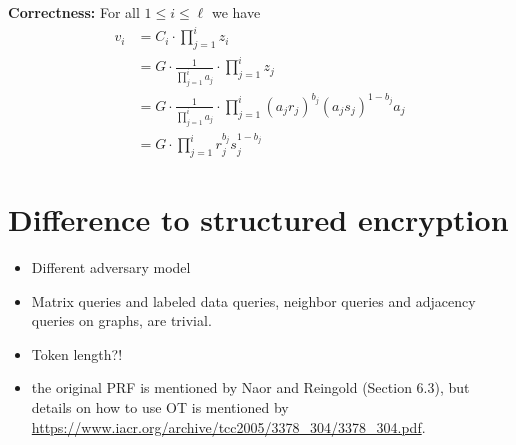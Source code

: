 {\bf Correctness:}  For all $1 \leq i \leq \ell$ we have
\begin{equation}
\begin{aligned}
v_i &= C_i \cdot \prod_{j=1}^{i} z_i \\
&= G \cdot \frac{1}{\prod_{j=1}^{i} a_j} \cdot \prod_{j=1}^{i} z_j \\
&= G \cdot \frac{1}{\prod_{j=1}^{i} a_j} \cdot \prod_{j=1}^{i} (a_jr_j)^{b_j}(a_js_j)^{1-b_j} a_j \\
&= G \cdot \prod_{j=1}^{i} r_j^{b_j}s_j^{1-b_j}
\end{aligned}
\end{equation}



\section{Difference to structured encryption}
\begin{itemize}
\item Different adversary model
\item Matrix queries and labeled data queries, neighbor queries and adjacency queries on graphs, are trivial.
\item Token length?!
\item the original PRF is mentioned by Naor and Reingold (Section 6.3), but details on how to use OT is mentioned by \url{https://www.iacr.org/archive/tcc2005/3378_304/3378_304.pdf}.  
\end{itemize}



